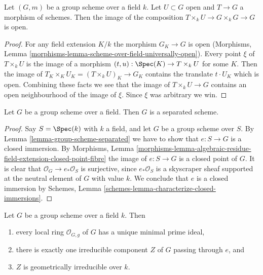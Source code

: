 \begin{lemma}
\label{lemma-group-scheme-over-field-translate-open}
Let $(G, m)$ be a group scheme over a field $k$. Let $U \subset G$
open and $T \to G$ a morphism of schemes. Then the image of the
composition $T \times_k U \to G \times_k G \to G$ is open.
\end{lemma}

\begin{proof}
For any field extension $K/k$ the morphism $G_K \to G$ is open
(Morphisms, Lemma \ref{morphisms-lemma-scheme-over-field-universally-open}).
Every point $\xi$ of $T \times_k U$ is the image of a morphism
$(t, u) : \Spec(K) \to T \times_k U$ for some $K$. Then the image of
$T_K \times_K U_K = (T \times_k U)_K \to G_K$ contains the translate
$t \cdot U_K$ which is open. Combining these facts we see that the
image of $T \times_k U \to G$ contains an open neighbourhood of
the image of $\xi$. Since $\xi$ was arbitrary we win.
\end{proof}

\begin{lemma}
\label{lemma-group-scheme-over-field-separated}
Let $G$ be a group scheme over a field.
Then $G$ is a separated scheme.
\end{lemma}

\begin{proof}
Say $S = \Spec(k)$ with $k$ a field, and let $G$ be a group scheme
over $S$. By
Lemma \ref{lemma-group-scheme-separated}
we have to show that $e : S \to G$ is a closed immersion. By
Morphisms, Lemma
\ref{morphisms-lemma-algebraic-residue-field-extension-closed-point-fibre}
the image of $e : S \to G$ is a closed point of $G$.
It is clear that $\mathcal{O}_G \to e_*\mathcal{O}_S$ is surjective,
since $e_*\mathcal{O}_S$ is a skyscraper sheaf supported at the neutral
element of $G$ with value $k$. We conclude that $e$ is a closed immersion by
Schemes, Lemma \ref{schemes-lemma-characterize-closed-immersions}.
\end{proof}

\begin{lemma}
\label{lemma-group-scheme-field-geometrically-irreducible}
Let $G$ be a group scheme over a field $k$.
Then
\begin{enumerate}
\item every local ring $\mathcal{O}_{G, g}$ of $G$ has a unique
minimal prime ideal,
\item there is exactly one irreducible component $Z$ of $G$
passing through $e$, and
\item $Z$ is geometrically irreducible over $k$.
\end{enumerate}
\end{lemma}

